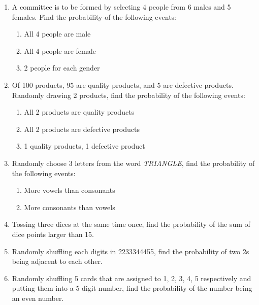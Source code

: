 \documentclass{report}
\begin{document}
\begin{multicols}{2}
\begin{enumerate}
    \item A committee is to be formed by selecting 4 people from 6 males and 5 females.
          Find the probability of the following events:

          \begin{enumerate}
            \item All 4 people are male
            \item All 4 people are female
            \item 2 people for each gender
          \end{enumerate}

    \item Of 100 products, 95 are quality products, and 5 are defective products.
          Randomly drawing 2 products, find the probability of the following events:

          \begin{enumerate}
            \item All 2 products are quality products
            \item All 2 products are defective products
            \item 1 quality products, 1 defective product
          \end{enumerate}

    \item Randomly choose 3 letters from the word \textit{TRIANGLE}, find the probability
          of the following events:
          \begin{enumerate}
            \item More vowels than consonants
            \item More consonants than vowels
          \end{enumerate}

    \item Tossing three dices at the same time once, find the probability of the sum of
          dice points larger than 15.

    \item Randomly shuffling each digits in 2233344455, find the probability of two 2s
          being adjacent to each other.

    \item Randomly shuffling 5 cards that are assigned to 1, 2, 3, 4, 5 respectively and
          putting them into a 5 digit number, find the probability of the number being an
          even number.
  \end{enumerate}


\end{multicols}
\end{document}
